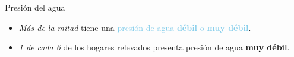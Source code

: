 \documentclass[aspectratio=169]{beamer}
\begin{document}
\begin{frame}{Presión del agua}
\begin{minipage}{.65\linewidth}
\begin{overlayarea}{\linewidth}{.75\textheight}
            \end{overlayarea}
        \end{minipage}
        \begin{minipage}{.34\linewidth}
            \setlength{\leftmargini}{12pt}
            \begin{itemize}
                \item<2-> \textit{Más de la mitad} tiene una \textcolor{skyblue}{presión de agua \textbf{débil} o \textbf{muy débil}}. 

                \item<4-> \textit{1 de cada 6} de los hogares relevados presenta \textcolor{gold!90!black}{presión de agua \textbf{muy débil}}.
            \end{itemize}
        \end{minipage}
    \end{frame}
\end{document}
